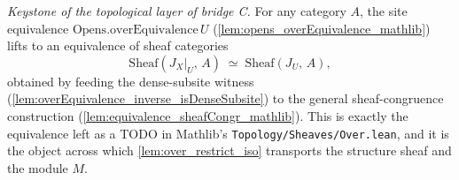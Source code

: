 \begin{definition}
  \label{def:overEquivalence_sheafCongr}
  \textit{Keystone of the topological layer of bridge C.}
  For any category \(A\), the site equivalence \(\mathrm{Opens.overEquivalence}\,U\)
  (\cref{lem:opens_overEquivalence_mathlib}) lifts to an equivalence of sheaf categories
  \[
    \mathrm{Sheaf}(J_X|_U,\, A) \;\simeq\; \mathrm{Sheaf}(J_U,\, A),
  \]
  obtained by feeding the dense-subsite witness
  (\cref{lem:overEquivalence_inverse_isDenseSubsite}) to the general sheaf-congruence
  construction (\cref{lem:equivalence_sheafCongr_mathlib}). This is exactly the equivalence left
  as a TODO in Mathlib's \texttt{Topology/Sheaves/Over.lean}, and it is the object across which
  \cref{lem:over_restrict_iso} transports the structure sheaf and the module \(M\).
\end{definition}





